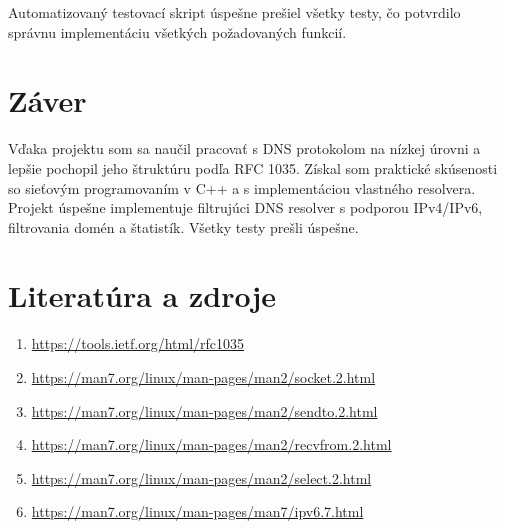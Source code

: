 \documentclass[12pt,a4paper]{article}
\begin{document}
Automatizovaný testovací skript úspešne prešiel všetky testy, čo potvrdilo správnu implementáciu všetkých požadovaných funkcií.

\section{Záver}

Vďaka projektu som sa naučil pracovať s DNS protokolom na nízkej úrovni a lepšie pochopil jeho štruktúru podľa RFC 1035. Získal som praktické skúsenosti so sieťovým programovaním v C++ a s implementáciou vlastného resolvera. Projekt úspešne implementuje filtrujúci DNS resolver s podporou IPv4/IPv6, filtrovania domén a štatistík. Všetky testy prešli úspešne.

\section{Literatúra a zdroje}

\begin{enumerate}
    \item \url{https://tools.ietf.org/html/rfc1035}
    \item \url{https://man7.org/linux/man-pages/man2/socket.2.html}
    \item \url{https://man7.org/linux/man-pages/man2/sendto.2.html}
    \item \url{https://man7.org/linux/man-pages/man2/recvfrom.2.html}
    \item \url{https://man7.org/linux/man-pages/man2/select.2.html}
    \item \url{https://man7.org/linux/man-pages/man7/ipv6.7.html}
\end{enumerate}
\end{document}
